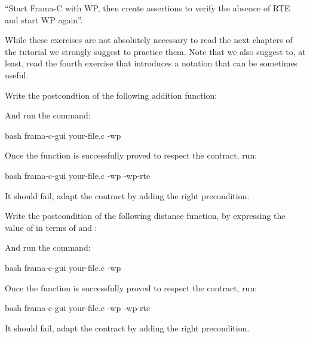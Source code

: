 ``Start Frama-C with WP, then create assertions to verify the absence of
RTE and start WP again''.






While these exercises are not absolutely necessary to read the next chapters
of the tutorial we strongly suggest to practice them. Note that we also
suggest to, at least, read the fourth exercise that introduces a notation
that can be sometimes useful.





Write the postcondtion of the following addition function:




And run the command:


\begin{CodeBlock}{bash}
frama-c-gui your-file.c -wp
\end{CodeBlock}


Once the function is successfully proved to respect the contract, run:


\begin{CodeBlock}{bash}
frama-c-gui your-file.c -wp -wp-rte
\end{CodeBlock}


It should fail, adapt the contract by adding the right precondition.




Write the postcondition of the following distance function, by expressing
the value of  in terms of  and
:




And run the command:


\begin{CodeBlock}{bash}
frama-c-gui your-file.c -wp
\end{CodeBlock}


Once the function is successfully proved to respect the contract, run:


\begin{CodeBlock}{bash}
frama-c-gui your-file.c -wp -wp-rte
\end{CodeBlock}


It should fail, adapt the contract by adding the right precondition.



